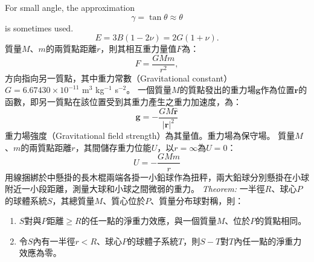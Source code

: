 \documentclass[a4paper,12pt]{article}
\begin{document}
For small angle, the approximation
\[\gamma=\tan\theta\approx\theta\]
is sometimes used.
\[E=3B(1-2\nu)=2G(1+\nu).\]
質量$M$、$m$的兩質點距離$r$，則其相互重力量值$F$為：
\[F=\frac{GMm}{r^2},\]
方向指向另一質點，其中重力常數（Gravitational constant） $G = 6.67430\times 10^{-11}$ m$^3$ kg$^{-1}$ s$^{-2}$。
一個質量$M$的質點發出的重力場$\mathbf{g}$作為位置$\mathbf{r}$的函數，即另一質點在該位置受到其重力產生之重力加速度，為：
\[\mathbf{g}=-\frac{GM\hat{\mathbf{r}}}{|\mathbf{r}|^2}\]
重力場強度（Gravitational field strength）為其量值。重力場為保守場。
質量$M$、$m$的兩質點距離$r$，其間儲存重力位能$U$，以$r=\infty$為$U=0$：
\[U=-\frac{GMm}{r}\]
用線捆綁於中懸掛的長木棍兩端各掛一小鉛球作為扭秤，兩大鉛球分別懸掛在小球附近一小段距離，測量大球和小球之間微弱的重力。
\textit{Theorem:} 一半徑$R$、球心$P$的球體系統$S$，其總質量$M$、質心位於$P$、質量分布球對稱，則：
\begin{enumerate}
\item $S$對與$P$距離$\geq R$的任一點的淨重力效應，與一個質量$M$、位於$P$的質點相同。
\item 令$S$內有一半徑$r<R$、球心$P$的球體子系統$T$，則$S-T$對$T$內任一點的淨重力效應為零。
\end{enumerate}
\end{document}
